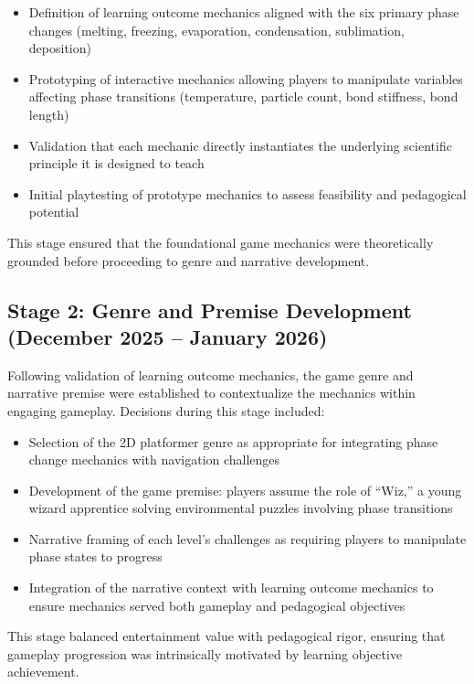 \begin{itemize}
    \item Definition of learning outcome mechanics aligned with the six primary phase changes (melting, freezing, evaporation, condensation, sublimation, deposition)
    \item Prototyping of interactive mechanics allowing players to manipulate variables affecting phase transitions (temperature, particle count, bond stiffness, bond length)
    \item Validation that each mechanic directly instantiates the underlying scientific principle it is designed to teach
    \item Initial playtesting of prototype mechanics to assess feasibility and pedagogical potential
\end{itemize}

This stage ensured that the foundational game mechanics were theoretically grounded before proceeding to genre and narrative development.

\subsection{Stage 2: Genre and Premise Development (December 2025 -- January 2026)}

Following validation of learning outcome mechanics, the game genre and narrative premise were established to contextualize the mechanics within engaging gameplay. Decisions during this stage included:

\begin{itemize}
    \item Selection of the 2D platformer genre as appropriate for integrating phase change mechanics with navigation challenges
    \item Development of the game premise: players assume the role of ``Wiz,'' a young wizard apprentice solving environmental puzzles involving phase transitions
    \item Narrative framing of each level's challenges as requiring players to manipulate phase states to progress
    \item Integration of the narrative context with learning outcome mechanics to ensure mechanics served both gameplay and pedagogical objectives
\end{itemize}

This stage balanced entertainment value with pedagogical rigor, ensuring that gameplay progression was intrinsically motivated by learning objective achievement.

